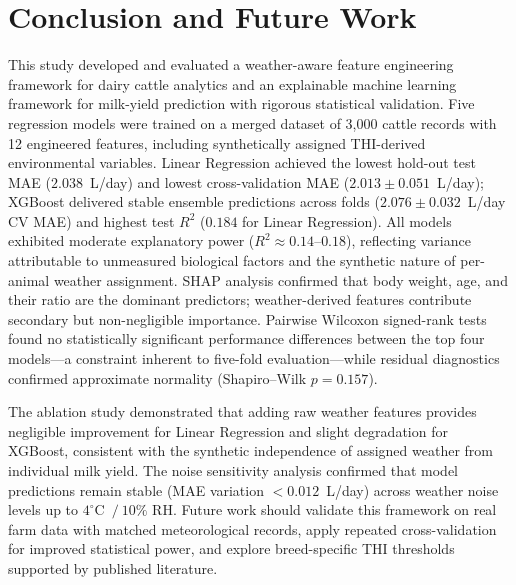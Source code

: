 \documentclass[conference]{IEEEtran}
\begin{document}
	\section{Conclusion and Future Work}
	
	This study developed and evaluated a weather-aware feature engineering framework for dairy cattle analytics and an explainable machine learning framework for milk-yield prediction with rigorous statistical validation. Five regression models were trained on a merged dataset of 3,000 cattle records with 12 engineered features, including synthetically assigned THI-derived environmental variables. Linear Regression achieved the lowest hold-out test MAE ($2.038$~L/day) and lowest cross-validation MAE ($2.013 \pm 0.051$~L/day); XGBoost delivered stable ensemble predictions across folds ($2.076 \pm 0.032$~L/day CV MAE) and highest test $R^2$ ($0.184$ for Linear Regression). All models exhibited moderate explanatory power ($R^2 \approx 0.14$--$0.18$), reflecting variance attributable to unmeasured biological factors and the synthetic nature of per-animal weather assignment. SHAP analysis confirmed that body weight, age, and their ratio are the dominant predictors; weather-derived features contribute secondary but non-negligible importance. Pairwise Wilcoxon signed-rank tests found no statistically significant performance differences between the top four models—a constraint inherent to five-fold evaluation—while residual diagnostics confirmed approximate normality (Shapiro--Wilk $p = 0.157$).
	
	The ablation study demonstrated that adding raw weather features provides negligible improvement for Linear Regression and slight degradation for XGBoost, consistent with the synthetic independence of assigned weather from individual milk yield. The noise sensitivity analysis confirmed that model predictions remain stable (MAE variation $< 0.012$~L/day) across weather noise levels up to $4^\circ$C~$/~10\%$ RH. Future work should validate this framework on real farm data with matched meteorological records, apply repeated cross-validation for improved statistical power, and explore breed-specific THI thresholds supported by published literature.
	
\end{document}
